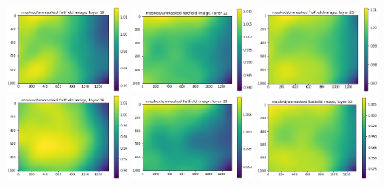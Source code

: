 \documentclass[letterpaper,11pt]{article}
\begin{document}
\begin{figure}[!ht]
\includegraphics[width=0.32\textwidth]{images/results/masked_over_unmasked_flatfield_image_layers_vectra/masked_over_unmasked_flatfield_image_layer_19}
\includegraphics[width=0.32\textwidth]{images/results/masked_over_unmasked_flatfield_image_layers_vectra/masked_over_unmasked_flatfield_image_layer_22}
\includegraphics[width=0.32\textwidth]{images/results/masked_over_unmasked_flatfield_image_layers_vectra/masked_over_unmasked_flatfield_image_layer_25}
\includegraphics[width=0.32\textwidth]{images/results/masked_over_unmasked_flatfield_image_layers_vectra/masked_over_unmasked_flatfield_image_layer_26}
\includegraphics[width=0.32\textwidth]{images/results/masked_over_unmasked_flatfield_image_layers_vectra/masked_over_unmasked_flatfield_image_layer_29}
\includegraphics[width=0.32\textwidth]{images/results/masked_over_unmasked_flatfield_image_layers_vectra/masked_over_unmasked_flatfield_image_layer_32}

\end{figure}
\end{document}
